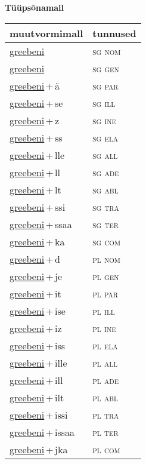 
\vspace{1.8em}
\begin{minipage}{\textwidth}
\textbf{Tüüpsõnamall \,}\\

\begin{sideways}
\begin{tabular}{l l}
muutvormimall & tunnused \\
\hline
\underline{greebeni} & \textsc{ sg nom } \\
\underline{greebeni} & \textsc{ sg gen } \\
\underline{greebeni}\,+\,ä & \textsc{ sg par } \\
\underline{greebeni}\,+\,se & \textsc{ sg ill } \\
\underline{greebeni}\,+\,z & \textsc{ sg ine } \\
\underline{greebeni}\,+\,ss & \textsc{ sg ela } \\
\underline{greebeni}\,+\,lle & \textsc{ sg all } \\
\underline{greebeni}\,+\,ll & \textsc{ sg ade } \\
\underline{greebeni}\,+\,lt & \textsc{ sg abl } \\
\underline{greebeni}\,+\,ssi & \textsc{ sg tra } \\
\underline{greebeni}\,+\,ssaa & \textsc{ sg ter } \\
\underline{greebeni}\,+\,ka & \textsc{ sg com } \\
\underline{greebeni}\,+\,d & \textsc{ pl nom } \\
\underline{greebeni}\,+\,je & \textsc{ pl gen } \\
\underline{greebeni}\,+\,it & \textsc{ pl par } \\
\underline{greebeni}\,+\,ise & \textsc{ pl ill } \\
\underline{greebeni}\,+\,iz & \textsc{ pl ine } \\
\underline{greebeni}\,+\,iss & \textsc{ pl ela } \\
\underline{greebeni}\,+\,ille & \textsc{ pl all } \\
\underline{greebeni}\,+\,ill & \textsc{ pl ade } \\
\underline{greebeni}\,+\,ilt & \textsc{ pl abl } \\
\underline{greebeni}\,+\,issi & \textsc{ pl tra } \\
\underline{greebeni}\,+\,issaa & \textsc{ pl ter } \\
\underline{greebeni}\,+\,jka & \textsc{ pl com } \\
\end{tabular}
\end{sideways}
\label{tab:tüüpsõnamall-greebeni}

\end{minipage}

